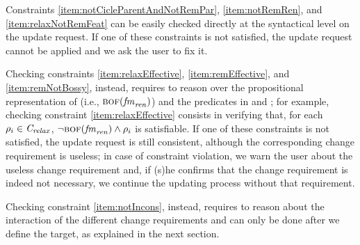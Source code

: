 \begin{tikzborder}{\cite{Gargantini16:validation}}
\begin{tikzborder}{\cite{gargantini_combinatorial_2017}}
\begin{tikzborder}{\cite{garn2019}}
\begin{tikzborder}{\cite{arcaini2019achieving}}
	Constraints
	\ref{item:notCicleParentAndNotRemPar},
	\ref{item:notRemRen}, and \ref{item:relaxNotRemFeat} can be easily checked directly at the syntactical level on the update request. If one of these constraints is not satisfied, the update request cannot be applied and we ask the user to fix it.
	
	Checking constraints \ref{item:relaxEffective}, \ref{item:remEffective}, and \ref{item:remNotBossy}, instead, requires to reason over the propositional representation of \fmrenamed (i.e., $\textsc{bof}(\mathit{fm}_{\mathit{ren}})$) and the predicates in \CFrelax and \CFrem; for example, checking constraint \ref{item:relaxEffective} consists in verifying that, for each $\rho_i \in \mathit{C_{relax}}$, $\neg \textsc{bof}(\mathit{fm}_{\mathit{ren}}) \wedge \rho_i$ is satisfiable. If one of these constraints is not satisfied, the update request is still consistent, although the corresponding change requirement is useless; in case of constraint violation, we warn the user about the useless change requirement and, if (s)he confirms that the change requirement is indeed not necessary, we continue the updating process without that requirement.
	
	Checking constraint \ref{item:notIncons}, instead, requires to reason about the interaction of the different change requirements and can only be done after we define the target, as explained in the next section.
	

\end{tikzborder}
\end{tikzborder}
\end{tikzborder}
\end{tikzborder}
